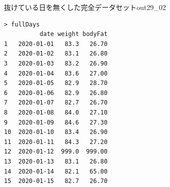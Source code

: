\begin{Rscreen}{抜けている日を無くした完全データセット}{out29_02}
	\begin{verbatim}
> fullDays
          date weight bodyFat
1   2020-01-01   83.3   26.70
2   2020-01-02   83.1   26.80
3   2020-01-03   83.2   26.90
4   2020-01-04   83.6   27.00
5   2020-01-05   82.9   28.70
6   2020-01-06   82.9   26.80
7   2020-01-07   82.7   26.70
8   2020-01-08   84.0   27.10
9   2020-01-09   84.6   27.30
10  2020-01-10   83.4   26.90
11  2020-01-11   84.3   27.20
12  2020-01-12  999.0  999.00
13  2020-01-13   83.1   26.80
14  2020-01-14   82.1   65.00
15  2020-01-15   82.7   26.70\end{verbatim}
\end{Rscreen}
